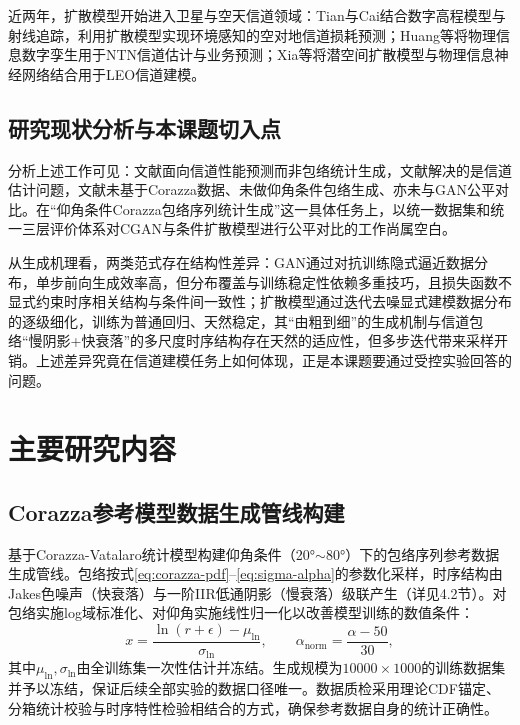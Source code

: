 \documentclass[12pt, a4paper]{ctexart}
\begin{document}
近两年，扩散模型开始进入卫星与空天信道领域：Tian与Cai\cite{tian2026scalable}结合数字高程模型与射线追踪，利用扩散模型实现环境感知的空对地信道损耗预测；Huang等\cite{huang2026physics}将物理信息数字孪生用于NTN信道估计与业务预测；Xia等\cite{xia2025leo}将潜空间扩散模型与物理信息神经网络结合用于LEO信道建模。

\subsection{研究现状分析与本课题切入点}
分析上述工作可见：文献\cite{tian2026scalable}面向信道性能预测而非包络统计生成，文献\cite{huang2026physics}解决的是信道估计问题，文献\cite{xia2025leo}未基于Corazza数据、未做仰角条件包络生成、亦未与GAN公平对比。在“仰角条件Corazza包络序列统计生成”这一具体任务上，以统一数据集和统一三层评价体系对CGAN与条件扩散模型进行公平对比的工作尚属空白。

从生成机理看，两类范式存在结构性差异：GAN通过对抗训练隐式逼近数据分布，单步前向生成效率高，但分布覆盖与训练稳定性依赖多重技巧，且损失函数不显式约束时序相关结构与条件间一致性；扩散模型通过迭代去噪显式建模数据分布的逐级细化，训练为普通回归、天然稳定，其“由粗到细”的生成机制与信道包络“慢阴影+快衰落”的多尺度时序结构存在天然的适应性，但多步迭代带来采样开销。上述差异究竟在信道建模任务上如何体现，正是本课题要通过受控实验回答的问题。

\section{主要研究内容}

\subsection{Corazza参考模型数据生成管线构建}
基于Corazza-Vatalaro统计模型\cite{corazza1994statistical}构建仰角条件（20°$\sim$80°）下的包络序列参考数据生成管线。包络按式\eqref{eq:corazza-pdf}--\eqref{eq:sigma-alpha}的参数化采样，时序结构由Jakes色噪声（快衰落）与一阶IIR低通阴影（慢衰落）级联产生（详见4.2节）。对包络实施log域标准化、对仰角实施线性归一化以改善模型训练的数值条件：
\begin{equation}
x = \frac{\ln(r+\epsilon) - \mu_{\ln}}{\sigma_{\ln}},\qquad \alpha_{\text{norm}} = \frac{\alpha - 50}{30},
\label{eq:standardize}
\end{equation}
其中$\mu_{\ln},\sigma_{\ln}$由全训练集一次性估计并冻结。生成规模为$10000\times 1000$的训练数据集并予以冻结，保证后续全部实验的数据口径唯一。数据质检采用理论CDF锚定、分箱统计校验与时序特性检验相结合的方式，确保参考数据自身的统计正确性。
\end{document}
